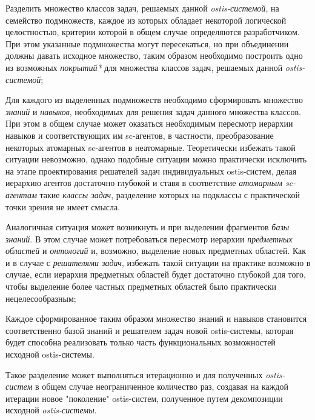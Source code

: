 \begin{textitemize}
	\item Разделить множество классов задач, решаемых данной \textit{ostis-системой}, на семейство подмножеств, каждое из которых обладает некоторой логической целостностью, критерии которой в общем случае определяются разработчиком. При этом указанные подмножества могут пересекаться, но при объединении должны давать исходное множество, таким образом необходимо построить одно из возможных \textit{покрытий*} для множества классов задач, решаемых данной \textit{ostis-системой};
	\item Для каждого из выделенных подмножеств необходимо сформировать множество \textit{знаний} и \textit{навыков}, необходимых для решения задач данного множества классов. При этом в общем случае может оказаться необходимым пересмотр иерархии навыков и соответствующих им sc-агентов, в частности, преобразование некоторых атомарных sc-агентов в неатомарные. Теоретически избежать такой ситуации невозможно, однако подобные ситуации можно практически исключить на этапе проектирования решателей задач индивидуальных ostis-систем, делая иерархию агентов достаточно глубокой и ставя в соответствие \textit{атомарным sc-агентам} такие \textit{классы задач}, разделение которых на подклассы с практической точки зрения не имеет смысла. 
	
	\vspace{-0.5\baselineskip}
	Аналогичная ситуация может возникнуть и при выделении фрагментов \textit{базы знаний}. В этом случае может потребоваться пересмотр иерархии \textit{предметных областей} и \textit{онтологий} и, возможно, выделение новых предметных областей. Как и в случае с \textit{решателями задач}, избежать такой ситуации на практике возможно в случае, если иерархия предметных областей будет достаточно глубокой для того, чтобы выделение более частных предметных областей было практически нецелесообразным;
	\vspace{0.5\baselineskip}
	
	\item Каждое сформированное таким образом множество знаний и навыков становится соответственно базой знаний и решателем задач новой ostis-системы, которая будет способна реализовать только часть функциональных возможностей исходной ostis-системы. 
\end{textitemize}

Такое разделение может выполняться итерационно и для полученных \textit{ostis-систем} в общем случае неограниченное количество раз, создавая на каждой итерации новое "поколение"{} ostis-систем, полученное путем декомпозиции исходной \textit{ostis-системы}. 

